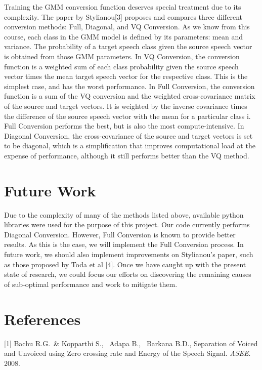 \documentclass{article}
\begin{document}
Training the GMM conversion function deserves special treatment due to its complexity. The paper by Stylianou[3] proposes and compares three different conversion methods: Full, Diagonal, and VQ Conversion. As we know from this course, each class in the GMM model is defined by its parameters: mean and variance. The probability of a target speech class given the source speech vector is obtained from those GMM parameters. In VQ Conversion, the conversion function is a weighted sum of each class probability given the source speech vector times the mean target speech vector for the respective class. This is the simplest case, and has the worst performance.  In Full Conversion, the conversion function is a sum of the VQ conversion and the weighted cross-covariance matrix of the source and target vectors. It is weighted by the inverse covariance times the difference of the source speech vector with the mean for a particular class i. Full Conversion performs the best, but is also the most compute-intensive. In Diagonal Conversion, the cross-covariance of the source and target vectors is set to be diagonal, which is a simplification that improves computational load at the expense of performance, although it still performs better than the VQ method. 

\section{Future Work}
 Due to the complexity of many of the methods listed above, available python libraries were used for the purpose of this project. Our code currently performs Diagonal Conversion. However, Full Conversion is known to provide better results. As this is the case, we will implement the Full Conversion process. In future work, we should also implement improvements on Stylianou's paper, such as those proposed by Toda et al [4]. Once we have caught up with the present state of research, we could focus our efforts on discovering the remaining causes of sub-optimal performance and work to mitigate them. 

\section*{References}

\small

[1] Bachu R.G.\ \& Kopparthi S., \ Adapa B., \ Barkana B.D., Separation of Voiced and Unvoiced using Zero crossing rate and Energy of the Speech Signal.  {\it ASEE}. 2008. 
 
\end{document}
